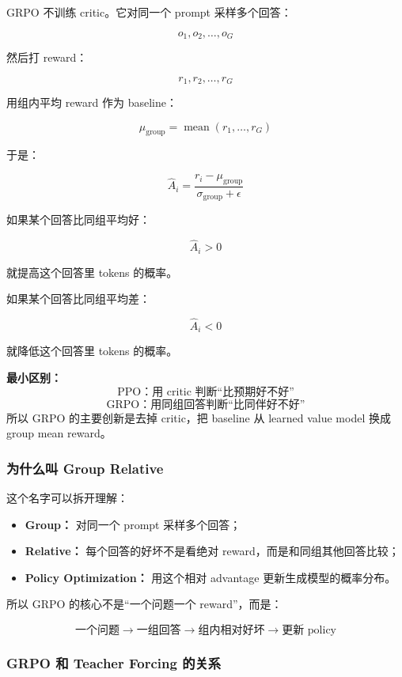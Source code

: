 GRPO 不训练 critic。它对同一个 prompt 采样多个回答：

\[
o_1,o_2,\ldots,o_G
\]

然后打 reward：

\[
r_1,r_2,\ldots,r_G
\]

用组内平均 reward 作为 baseline：

\[
\mu_\text{group} = \operatorname{mean}(r_1,\ldots,r_G)
\]

于是：

\[
\hat{A}_i
=
\frac{r_i-\mu_\text{group}}{\sigma_\text{group}+\epsilon}
\]

如果某个回答比同组平均好：

\[
\hat{A}_i > 0
\]

就提高这个回答里 tokens 的概率。

如果某个回答比同组平均差：

\[
\hat{A}_i < 0
\]

就降低这个回答里 tokens 的概率。

\begin{summarybox}
\textbf{最小区别：}
\[
\text{PPO：用 critic 判断“比预期好不好”}
\]
\[
\text{GRPO：用同组回答判断“比同伴好不好”}
\]
所以 GRPO 的主要创新是去掉 critic，把 baseline 从 learned value model 换成 group mean reward。
\end{summarybox}

\subsubsection{为什么叫 Group Relative}

这个名字可以拆开理解：

\begin{itemize}[leftmargin=1.5em]
  \item \textbf{Group：} 对同一个 prompt 采样多个回答；
  \item \textbf{Relative：} 每个回答的好坏不是看绝对 reward，而是和同组其他回答比较；
  \item \textbf{Policy Optimization：} 用这个相对 advantage 更新生成模型的概率分布。
\end{itemize}

所以 GRPO 的核心不是“一个问题一个 reward”，而是：

\[
\text{一个问题}
\to
\text{一组回答}
\to
\text{组内相对好坏}
\to
\text{更新 policy}
\]

\subsubsection{GRPO 和 Teacher Forcing 的关系}

